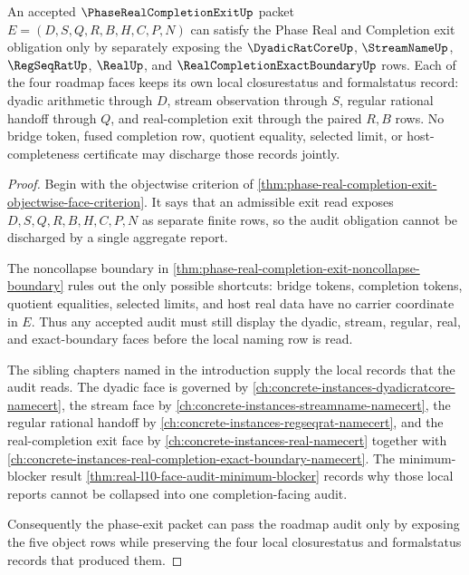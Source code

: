 \begin{theorem}
\label{thm:phase-real-completion-exit-facewise-audit-obligation}
An accepted $\PhaseRealCompletionExitUp$ packet $E=(D,S,Q,R,B,H,C,P,N)$ can satisfy the Phase Real and Completion exit obligation only by separately exposing the $\DyadicRatCoreUp$, $\StreamNameUp$, $\RegSeqRatUp$, $\RealUp$, and $\RealCompletionExactBoundaryUp$ rows. Each of the four roadmap faces keeps its own local closurestatus and formalstatus record: dyadic arithmetic through $D$, stream observation through $S$, regular rational handoff through $Q$, and real-completion exit through the paired $R,B$ rows. No bridge token, fused completion row, quotient equality, selected limit, or host-completeness certificate may discharge those records jointly.
\end{theorem}
\begin{proof}
Begin with the objectwise criterion of \autoref{thm:phase-real-completion-exit-objectwise-face-criterion}. It says that an admissible exit read exposes $D,S,Q,R,B,H,C,P,N$ as separate finite rows, so the audit obligation cannot be discharged by a single aggregate report.

The noncollapse boundary in \autoref{thm:phase-real-completion-exit-noncollapse-boundary} rules out the only possible shortcuts: bridge tokens, completion tokens, quotient equalities, selected limits, and host real data have no carrier coordinate in $E$. Thus any accepted audit must still display the dyadic, stream, regular, real, and exact-boundary faces before the local naming row is read.

The sibling chapters named in the introduction supply the local records that the audit reads. The dyadic face is governed by \autoref{ch:concrete-instances-dyadicratcore-namecert}, the stream face by \autoref{ch:concrete-instances-streamname-namecert}, the regular rational handoff by \autoref{ch:concrete-instances-regseqrat-namecert}, and the real-completion exit face by \autoref{ch:concrete-instances-real-namecert} together with \autoref{ch:concrete-instances-real-completion-exact-boundary-namecert}. The minimum-blocker result \autoref{thm:real-l10-face-audit-minimum-blocker} records why those local reports cannot be collapsed into one completion-facing audit.

Consequently the phase-exit packet can pass the roadmap audit only by exposing the five object rows while preserving the four local closurestatus and formalstatus records that produced them.
\end{proof}

